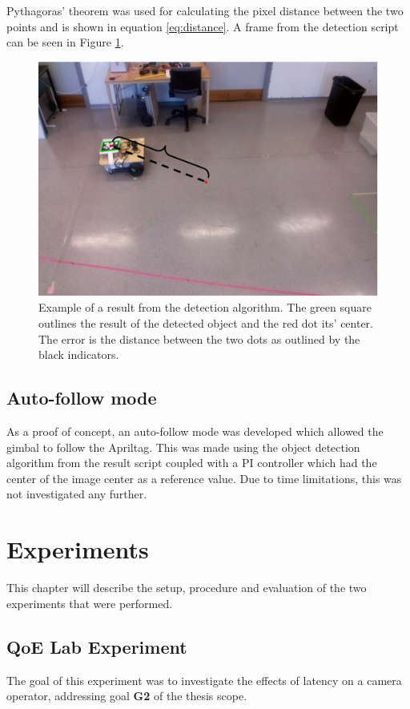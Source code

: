 \documentclass[nofilelist]{cslthse-msc}
\begin{document}
Pythagoras' theorem was used for calculating the pixel distance between the two points and is shown in equation \ref{eq:distance}. A frame from the detection script can be seen in Figure \ref{fig:resultcalc}.

\begin{figure}[!hbt]
   \centering
   \includegraphics[scale=0.3]{images/resultcalc.png} 
   \caption{Example of a result from the detection algorithm. The green square outlines the result of the detected object and the red dot its' center. The error is the distance between the two dots as outlined by the black indicators.}
   \label{fig:resultcalc}
\end{figure}

\section{Auto-follow mode}
As a proof of concept, an auto-follow mode was developed which allowed the gimbal to follow the Apriltag. This was made using the object detection algorithm from the result script coupled with a PI controller which had the center of the image center as a reference value. Due to time limitations, this was not investigated any further.

\chapter{Experiments}
This chapter will describe the setup, procedure and evaluation of the two experiments that were performed.

\section{QoE Lab Experiment}
The goal of this experiment was to investigate the effects of latency on a camera operator, addressing goal \textbf{G2} of the thesis scope.
\end{document}
